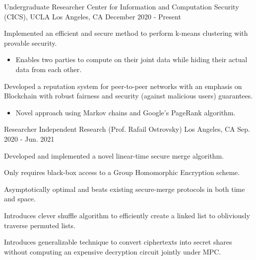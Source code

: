 \begin{cventries}
  \cventry
    {Undergraduate Researcher} %
    {Center for Information and Computation Security (CICS), UCLA} %
    {Los Angeles, CA} %
    {December 2020 - Present} %
    {
      \begin{cvitems} %
        \item{Implemented an efficient and secure method to perform k-means clustering with provable security.}
        \begin{itemize}
          \item{Enables two parties to compute on their joint data while hiding their actual data from each other.}
        \end{itemize}
        \item{Developed a reputation system for peer-to-peer networks with an emphasis on Blockchain with robust fairness and security (against malicious users) guarantees.}
        \begin{itemize}
          \item{Novel approach using Markov chains and Google's PageRank algorithm.}
        \end{itemize}
      \end{cvitems}
    }

  \cventry
    {Researcher} %
    {Independent Research (Prof. Rafail Ostrovsky)} %
    {Los Angeles, CA} %
    {Sep. 2020 - Jun. 2021} %
    {
      \begin{cvitems} %
        \item{Developed and implemented a novel linear-time secure merge algorithm.}
        \item{Only requires black-box access to a Group Homomorphic Encryption scheme.}
        \item{Asymptotically optimal and beats existing secure-merge protocols in both time and space.}
        \item{Introduces clever shuffle algorithm to efficiently create a linked list to obliviously traverse permuted lists.}
        \item{Introduces generalizable technique to convert ciphertexts into secret shares without computing an expensive decryption circuit jointly under MPC.}
      \end{cvitems}
    }


\end{cventries}
